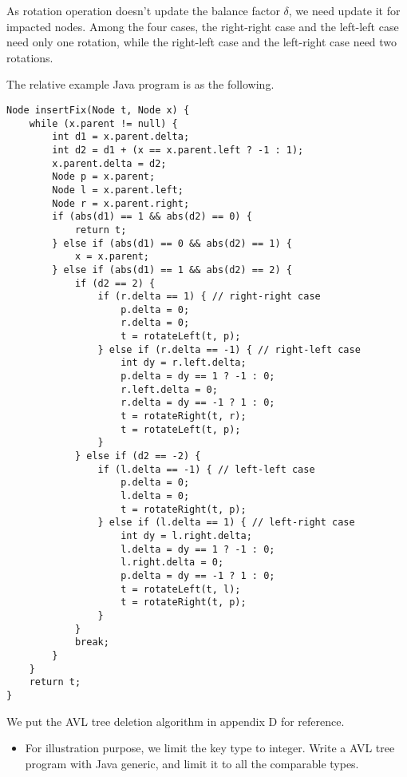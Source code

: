 \documentclass{article}
\begin{document}
As rotation operation doesn't update the balance factor $\delta$,
we need update it for impacted nodes. Among the four cases, the right-right case and the left-left case need only one rotation, while the right-left case and the left-right case need two rotations.

The relative example Java program is as the following.

\begin{lstlisting}
Node insertFix(Node t, Node x) {
    while (x.parent != null) {
        int d1 = x.parent.delta;
        int d2 = d1 + (x == x.parent.left ? -1 : 1);
        x.parent.delta = d2;
        Node p = x.parent;
        Node l = x.parent.left;
        Node r = x.parent.right;
        if (abs(d1) == 1 && abs(d2) == 0) {
            return t;
        } else if (abs(d1) == 0 && abs(d2) == 1) {
            x = x.parent;
        } else if (abs(d1) == 1 && abs(d2) == 2) {
            if (d2 == 2) {
                if (r.delta == 1) { // right-right case
                    p.delta = 0;
                    r.delta = 0;
                    t = rotateLeft(t, p);
                } else if (r.delta == -1) { // right-left case
                    int dy = r.left.delta;
                    p.delta = dy == 1 ? -1 : 0;
                    r.left.delta = 0;
                    r.delta = dy == -1 ? 1 : 0;
                    t = rotateRight(t, r);
                    t = rotateLeft(t, p);
                }
            } else if (d2 == -2) {
                if (l.delta == -1) { // left-left case
                    p.delta = 0;
                    l.delta = 0;
                    t = rotateRight(t, p);
                } else if (l.delta == 1) { // left-right case
                    int dy = l.right.delta;
                    l.delta = dy == 1 ? -1 : 0;
                    l.right.delta = 0;
                    p.delta = dy == -1 ? 1 : 0;
                    t = rotateLeft(t, l);
                    t = rotateRight(t, p);
                }
            }
            break;
        }
    }
    return t;
}
\end{lstlisting}

We put the AVL tree deletion algorithm in appendix D for reference.

\begin{Exercise}

\begin{itemize}
\item For illustration purpose, we limit the key type to integer. Write a AVL tree program with Java generic, and limit it to all the comparable types.

\end{itemize}

\end{Exercise}
\end{document}
